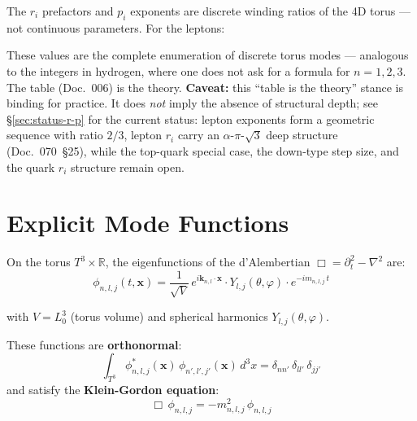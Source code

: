 The $r_i$ prefactors and $p_i$ exponents are discrete winding ratios
of the 4D torus — not continuous parameters. For the leptons:

\begin{center}
{\footnotesize
{}
}
\end{center}

These values are the complete enumeration of discrete torus modes —
analogous to the integers in hydrogen, where one does not ask for
a formula for $n=1,2,3$. The table (Doc.~006) is the theory.
\textbf{Caveat:} this \enquote{table is the theory} stance is binding
for practice. It does \emph{not} imply the absence of structural
depth; see §\ref{sec:status-r-p} for the current status: lepton
exponents form a geometric sequence with ratio $2/3$, lepton
$r_i$ carry an $\alpha$-$\pi$-$\sqrt{3}$ deep structure (Doc.~070~§25),
while the top-quark special case, the down-type step size, and the
quark $r_i$ structure remain open.

\section{Explicit Mode Functions}

On the torus $T^3 \times \mathbb{R}$, the eigenfunctions of the
d'Alembertian $\Box = \partial_t^2 - \nabla^2$ are:
\begin{equation}
  \boxed{
    \phi_{n,l,j}(t,\mathbf{x})
    = \frac{1}{\sqrt{V}}\,
      e^{i\mathbf{k}_{n,l}\cdot\mathbf{x}} \cdot
      Y_{l,j}(\theta,\varphi) \cdot
      e^{-im_{n,l,j}\,t}
  }
\end{equation}

with $V = L_0^3$ (torus volume) and spherical harmonics $Y_{l,j}(\theta,\varphi)$.

These functions are \textbf{orthonormal}:
\begin{equation}
  \int_{T^3} \phi_{n,l,j}^*(\mathbf{x})\,\phi_{n',l',j'}(\mathbf{x})\,d^3x
  = \delta_{nn'}\,\delta_{ll'}\,\delta_{jj'}
\end{equation}
and satisfy the \textbf{Klein-Gordon equation}:
\begin{equation}
  \Box\,\phi_{n,l,j} = -m_{n,l,j}^2\,\phi_{n,l,j}
\end{equation}

